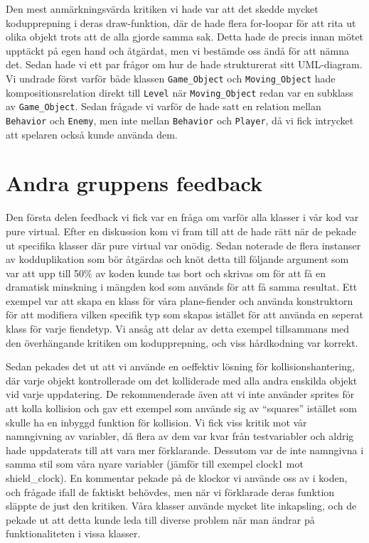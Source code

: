 \documentclass{TDP003mall}
\begin{document}
Den mest anmärkningsvärda kritiken vi hade var att det skedde mycket kodupprepning i deras draw-funktion, där de hade flera for-loopar för att rita ut olika objekt trots att de alla gjorde samma sak.
Detta hade de precis innan mötet upptäckt på egen hand och åtgärdat, men vi bestämde oss ändå för att nämna det.
Sedan hade vi ett par frågor om hur de hade strukturerat sitt UML-diagram. 
Vi undrade först varför både klassen \texttt{Game\_Object} och \texttt{Moving\_Object} hade kompositionsrelation direkt till \texttt{Level} när \texttt{Moving\_Object} redan var en subklass av \texttt{Game\_Object}.
Sedan frågade vi varför de hade satt en relation mellan \texttt{Behavior} och \texttt{Enemy}, men inte mellan \texttt{Behavior} och \texttt{Player}, då vi fick intrycket att spelaren också kunde använda dem.


\section{Andra gruppens feedback}
Den första delen feedback vi fick var en fråga om varför alla klasser i vår kod var pure virtual. 
Efter en diskussion kom vi fram till att de hade rätt när de pekade ut specifika klasser där pure virtual var onödig. 
Sedan noterade de flera instanser av kodduplikation som bör åtgärdas och knöt detta till följande argument som var att upp till 50\% av koden kunde tas bort och skrivas om för att få en dramatisk minskning i mängden kod som används för att få samma resultat. 
Ett exempel var att skapa en klass för våra plane-fiender och använda konstruktorn för att modifiera vilken specifik typ som skapas istället för att använda en seperat klass för varje fiendetyp. 
Vi ansåg att delar av detta exempel tillsammans med den överhängande kritiken om kodupprepning, och viss hårdkodning var korrekt.

Sedan pekades det ut att vi använde en oeffektiv lösning för kollisionshantering, där varje objekt kontrollerade om det kolliderade med alla andra enskilda objekt vid varje uppdatering. 
De rekommenderade även att vi inte använder sprites för att kolla kollision och gav ett exempel som använde sig av ``squares'' istället som skulle ha en inbyggd funktion för kollision.
Vi fick viss kritik mot vår namngivning av variabler, då flera av dem var kvar från testvariabler och aldrig hade uppdaterats till att vara mer förklarande. Dessutom var de inte namngivna i samma stil som våra nyare variabler (jämför till exempel clock1 mot shield\_clock). 
En kommentar pekade på de klockor vi använde oss av i koden, och frågade ifall de faktiskt behövdes, men när vi förklarade deras funktion släppte de just den kritiken.
Våra klasser använde mycket lite inkapsling, och de pekade ut att detta kunde leda till diverse problem när man ändrar på funktionaliteten i vissa klasser. 
\end{document}

